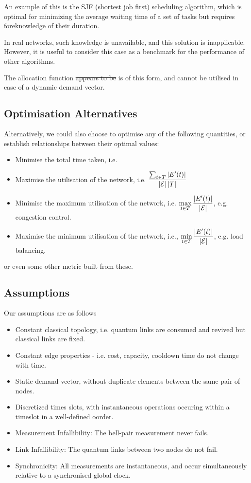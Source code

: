 \documentclass{amsart}
\begin{document}
    An example of this is the SJF (shortest job first) scheduling algorithm, which is optimal for minimizing the average waiting time of a set of tasks but requires foreknowledge of their duration.

    In real networks, such knowledge is unavailable, and this solution is inapplicable. However, it is useful to consider this case as a benchmark for the performance of other algorithms.

    The allocation function \sout{appears to be} is of this form, and cannot be utilised in case of a dynamic demand vector.

    \subsection{Optimisation Alternatives}

    Alternatively, we could also choose to optimise any of the following quantities, or establish relationships between their optimal values: \begin{itemize}
        \item Minimise the total time taken, i.e. 
        \item Maximise the utilisation of the network, i.e. \(\displaystyle \frac{\sum_{t \in T} \left|E'(t)\right|}{\left|\mathcal{E}\right| \left|T\right|}\)
        \item Minimise the maximum utilisation of the network, i.e. \(\displaystyle \max_{t \in T} \frac{\left|E'(t)\right|}{\left|\mathcal{E}\right|}\), e.g. congestion control.
        \item Maximise the minimum utilisation of the network, i.e., \(\displaystyle \min_{t \in T} \frac{\left|E'(t)\right|}{\left|\mathcal{E}\right|}\), e.g. load balancing.
    \end{itemize}

    or even some other metric built from these.

    \subsection{Assumptions}

    Our assumptions are as follows
    \begin{itemize}
        \item Constant classical topology, i.e. quantum links are consumed and revived but classical links are fixed.
        \item Constant edge properties - i.e. cost, capacity, cooldown time do not change with time.
        \item Static demand vector, without duplicate elements between the same pair of nodes.
        \item Discretized times slots, with instantaneous operations occuring within a timeslot in a well-defined oorder.
        \item Measurement Infallibility: The bell-pair measurement never fails.
        \item Link Infallibility: The quantum links between two nodes do not fail.
        \item Synchronicity: All measurements are instantaneous, and occur simultaneously relative to a synchronised global clock.
    \end{itemize}
\end{document}
